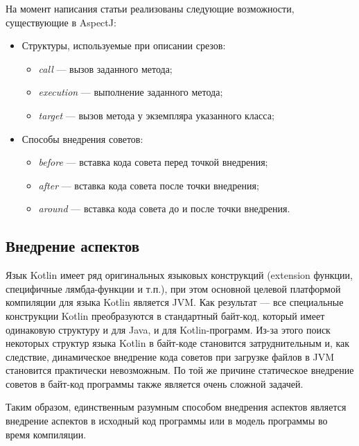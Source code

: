 \documentclass[conference]{IEEEtran}
\begin{document}
На момент написания статьи реализованы следующие возможности, существующие в
AspectJ:
\begin{itemize}
    \item Структуры, используемые при описании срезов:
        \begin{itemize}
            \item \textit{call} --- вызов заданного метода;
            \item \textit{execution} --- выполнение заданного метода;
            \item \textit{target} --- вызов метода у экземпляра указанного
              класса;
        \end{itemize}
    \item Способы внедрения советов:
        \begin{itemize}
            \item \textit{before} --- вставка кода совета перед точкой
                внедрения;
            \item \textit{after} --- вставка кода совета после точки внедрения;
            \item \textit{around} --- вставка кода совета до и после точки
                внедрения.
        \end{itemize}
\end{itemize}

\subsection{Внедрение аспектов}

Язык Kotlin имеет ряд оригинальных языковых конструкций (extension функции,
специфичные лямбда-функции и т.п.), при этом основной целевой платформой
компиляции для языка Kotlin является JVM.
Как результат --- все специальные конструкции Kotlin преобразуются в стандартный
байт-код, который имеет одинаковую структуру и для Java, и для Kotlin-программ.
Из-за этого поиск некоторых структур языка Kotlin в байт-коде становится
затруднительным и, как следствие, динамическое внедрение кода советов при
загрузке файлов в JVM становится практически невозможным.
По той же причине статическое внедрение советов в байт-код программы также
является очень сложной задачей.

Таким образом, единственным разумным способом внедрения аспектов является
внедрение аспектов в исходный код программы или в модель программы во время
компиляции. 
\end{document}
